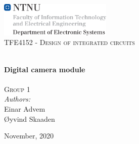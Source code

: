 
\begin{titlepage}
\vbox{ }
\vbox{ }
\begin{center}
\includegraphics[width=0.40\textwidth]{Images/NTNU_ies.png}\\[1cm]
\textsc{\Large TFE4152 - Design of integrated circuits}\\[0.5cm]
\vbox{ }

\HRule \\[0.4cm]
{ \huge \bfseries Digital camera module}\\[0.4cm]
\HRule \\[1.5cm]

\textsc{\Large Group 1}\\[0.5cm]

\large
\emph{Authors:}\\
Einar Advem \\
Øyvind Skaaden
\vfill

{\large November, 2020}
\end{center}
\end{titlepage}